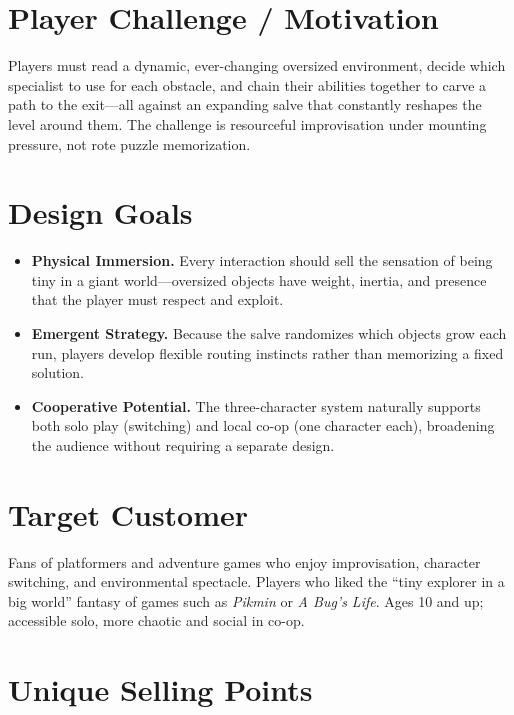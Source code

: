 \documentclass[11pt, letterpaper]{article}
\begin{document}
\section*{Player Challenge / Motivation}

Players must read a dynamic, ever-changing oversized environment, decide which specialist to use for
each obstacle, and chain their abilities together to carve a path to the exit---all against an
expanding salve that constantly reshapes the level around them. The challenge is resourceful
improvisation under mounting pressure, not rote puzzle memorization.

\section*{Design Goals}

\begin{itemize}[leftmargin=1.5em, itemsep=2pt]
    \item \textbf{Physical Immersion.} Every interaction should sell the sensation of being tiny
    in a giant world---oversized objects have weight, inertia, and presence that the player
    must respect and exploit.
    \item \textbf{Emergent Strategy.} Because the salve randomizes which objects grow each run,
    players develop flexible routing instincts rather than memorizing a fixed solution.
    \item \textbf{Cooperative Potential.} The three-character system naturally supports both solo
    play (switching) and local co-op (one character each), broadening the audience without
    requiring a separate design.
\end{itemize}

\section*{Target Customer}

Fans of platformers and adventure games who enjoy improvisation, character switching, and
environmental spectacle. Players who liked the ``tiny explorer in a big world'' fantasy of games
such as \textit{Pikmin} or \textit{A Bug's Life}. Ages 10 and up; accessible solo, more chaotic
and social in co-op.

\section*{Unique Selling Points}
\end{document}
